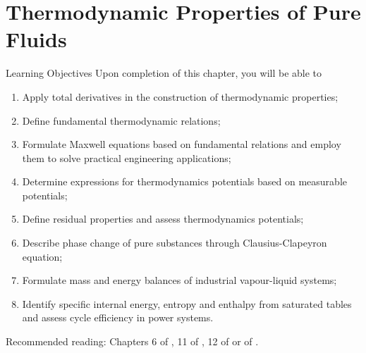 \chapter{Thermodynamic Properties of Pure Fluids}\label{Chapter:ThermodynamicPropertiesPureFluids}

   \begin{LearningObjectivesBlock}{Learning Objectives}
      Upon completion of this chapter, you will be able to
        \begin{enumerate}
           \item Apply total derivatives in the construction of thermodynamic properties;
           \item Define fundamental thermodynamic relations;
           \item Formulate Maxwell equations based on fundamental relations and employ them to solve practical engineering applications;
           \item Determine expressions for thermodynamics potentials based on measurable potentials;
           \item Define residual properties and assess thermodynamics potentials;
           \item Describe phase change of pure substances through Clausius-Clapeyron equation;
           \item Formulate mass and energy balances of industrial vapour-liquid systems;
           \item Identify specific internal energy, entropy and enthalpy from saturated tables and assess cycle efficiency in power systems.
        \end{enumerate}
\medskip
     Recommended reading: Chapters 6 of \citet{SmithVanNess_Book}, 11 of \citet{Balmer_Book}, 12 of \citet{Borgnakke_Book} or  of \citet{Atkins_Book}.
   \end{LearningObjectivesBlock}


\begin{comment}
   \begin{LearningObjectivesBlock}{Learning Objectives}
      Upon completion of this chapter, you will be able to
        \begin{enumerate}
           \item {\bf Knowledge:} Define, Name, Select, State 
           \item {\bf Comprehension:} Describe, Identify, Discuss
           \item {\bf Application:} Apply, Demonstrate, Employ, Sketch
           \item {\bf Analysis:} Analyse, Compare, Calculate, Solve
           \item {\bf Synthesis:} Determine, Formulate
           \item {\bf Evaluation:} Assess, Check, Estimate, Compare, Measure, Monitor
        \end{enumerate}
\end{comment}

